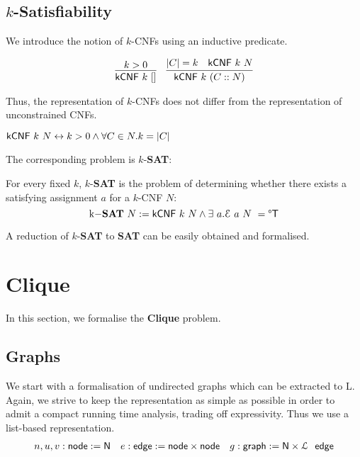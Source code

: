 \documentclass[a4paper,UKenglish,cleveref, autoref]{lipics-v2019}
\begin{document}
\subsection{$k$-Satisfiability}
We introduce the notion of $k$-CNFs using an inductive predicate.

\begin{align*}
  \infer{\textsf{kCNF}~k~[]}{k > 0} && \infer{\textsf{kCNF}~k~(C::N)}{\length{C} = k \quad \textsf{kCNF}~k~N}
\end{align*}

Thus, the representation of $k$-CNFs does not differ from the representation of unconstrained CNFs. 

\begin{proposition}\label{prop:kCNFexp}
  $\textsf{kCNF}~k~N \leftrightarrow k > 0 \land \forall C \in N. k = |C|$
\end{proposition}

The corresponding problem is $k$-\textbf{SAT}:
\begin{definition}
  For every fixed $k$, $k$-\textbf{SAT} is the problem of determining whether there exists a satisfying assignment $a$ for a $k$-CNF $N$: 
  \[$k$-\textbf{SAT}~N := \textsf{kCNF}~k~N \land \exists~a.\eval{a}{N} = \Some{\btrue} \]
\end{definition}

A reduction of $k$-\textbf{SAT} to \textbf{SAT} can be easily obtained and formalised.

\section{Clique}
In this section, we formalise the \textbf{Clique} problem. 

\subsection{Graphs}
\newcommand{\lnode}{\textsf{node}}
\newcommand{\ledge}{\textsf{edge}}
\newcommand{\lgraph}{\textsf{graph}}
We start with a formalisation of undirected graphs which can be extracted to L. Again, we strive to keep the representation as simple as possible in order to admit a compact running time analysis, trading off expressivity. Thus we use a list-based representation.
\begin{align*}
  n,u,v : \lnode := \nat && e : \ledge := \lnode \times \lnode && g : \lgraph := \nat \times \listsof~\ledge 
\end{align*}
\end{document}
